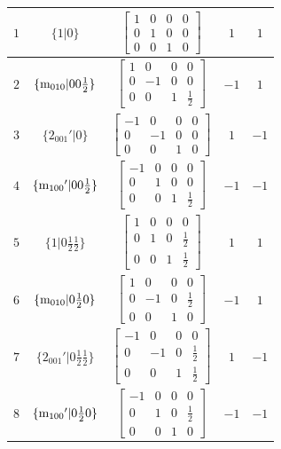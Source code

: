 \documentclass[fleqn,8pt]{jsarticle}
\begin{document}
\begin{longtable}{ccccc}
$ 1 $ & $ \{1|0\} $ & $ \begin{bmatrix} 1 & 0 & 0 & 0 \\ 0 & 1 & 0 & 0 \\ 0 & 0 & 1 & 0 \end{bmatrix} $ & $ 1 $ & $ 1 $ \\ \hline
$ 2 $ & $ \{{\rm m}_{010}|0 0 \frac{1}{2}\} $ & $ \begin{bmatrix} 1 & 0 & 0 & 0 \\ 0 & -1 & 0 & 0 \\ 0 & 0 & 1 & \frac{1}{2} \end{bmatrix} $ & $ -1 $ & $ 1 $ \\ \hline
$ 3 $ & $ \{2{}_{001}{}'|0\} $ & $ \begin{bmatrix} -1 & 0 & 0 & 0 \\ 0 & -1 & 0 & 0 \\ 0 & 0 & 1 & 0 \end{bmatrix} $ & $ 1 $ & $ -1 $ \\ \hline
$ 4 $ & $ \{{\rm m}_{100}{}'|0 0 \frac{1}{2}\} $ & $ \begin{bmatrix} -1 & 0 & 0 & 0 \\ 0 & 1 & 0 & 0 \\ 0 & 0 & 1 & \frac{1}{2} \end{bmatrix} $ & $ -1 $ & $ -1 $ \\ \hline
$ 5 $ & $ \{1|0 \frac{1}{2} \frac{1}{2}\} $ & $ \begin{bmatrix} 1 & 0 & 0 & 0 \\ 0 & 1 & 0 & \frac{1}{2} \\ 0 & 0 & 1 & \frac{1}{2} \end{bmatrix} $ & $ 1 $ & $ 1 $ \\ \hline
$ 6 $ & $ \{{\rm m}_{010}|0 \frac{1}{2} 0\} $ & $ \begin{bmatrix} 1 & 0 & 0 & 0 \\ 0 & -1 & 0 & \frac{1}{2} \\ 0 & 0 & 1 & 0 \end{bmatrix} $ & $ -1 $ & $ 1 $ \\ \hline
$ 7 $ & $ \{2{}_{001}{}'|0 \frac{1}{2} \frac{1}{2}\} $ & $ \begin{bmatrix} -1 & 0 & 0 & 0 \\ 0 & -1 & 0 & \frac{1}{2} \\ 0 & 0 & 1 & \frac{1}{2} \end{bmatrix} $ & $ 1 $ & $ -1 $ \\ \hline
$ 8 $ & $ \{{\rm m}_{100}{}'|0 \frac{1}{2} 0\} $ & $ \begin{bmatrix} -1 & 0 & 0 & 0 \\ 0 & 1 & 0 & \frac{1}{2} \\ 0 & 0 & 1 & 0 \end{bmatrix} $ & $ -1 $ & $ -1 $ \\
\end{longtable}
\end{document}
